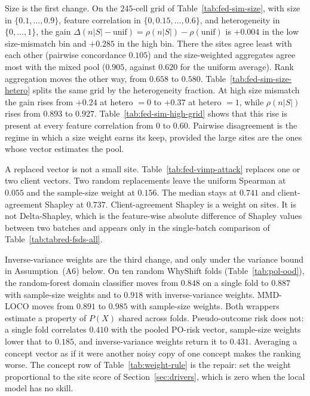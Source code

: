 Size is the first change.
On the \(245\)-cell grid of Table~\ref{tab:fed-sim-size}, with size in
\(\{0.1,\ldots,0.9\}\), feature correlation in \(\{0,0.15,\ldots,0.6\}\),
and heterogeneity in \(\{0,\ldots,1\}\), the gain
\(\Delta(n|S|-\mathrm{unif})=\rho(n|S|)-\rho(\mathrm{unif})\) is
\(+0.004\) in the low size-mismatch bin and \(+0.285\) in the high bin.
There the sites agree least with each other (pairwise concordance
\(0.105\)) and the size-weighted aggregates agree most with the mixed pool
(\(0.905\), against \(0.620\) for the uniform average).
Rank aggregation moves the other way, from \(0.658\) to \(0.580\).
Table~\ref{tab:fed-sim-size-hetero} splits the same grid by the
heterogeneity fraction.
At high size mismatch the gain rises from \(+0.24\) at hetero \(=0\) to
\(+0.37\) at hetero \(=1\), while \(\rho(n|S|)\) rises from \(0.893\) to
\(0.927\).
Table~\ref{tab:fed-sim-high-grid} shows that this rise is present at every
feature correlation from \(0\) to \(0.60\).
Pairwise disagreement is the regime in which a size weight earns its keep,
provided the large sites are the ones whose vector estimates the pool.

A replaced vector is not a small site.
Table~\ref{tab:fed-vimp-attack} replaces one or two client vectors.
Two random replacements leave the uniform Spearman at \(0.055\) and the
sample-size weight at \(0.156\).
The median stays at \(0.741\) and client-agreement Shapley at \(0.737\).
Client-agreement Shapley is a weight on sites.
It is not Delta-Shapley, which is the feature-wise absolute difference of
Shapley values between two batches and appears only in the single-batch
comparison of Table~\ref{tab:tabred-fsds-all}.

Inverse-variance weights are the third change, and only under the variance
bound in Assumption~(A6) below.
On ten random WhyShift folds
(Table~\ref{tab:pol-ood}), the random-forest domain classifier moves from
\(0.848\) on a single fold to \(0.887\) with sample-size weights and to
\(0.918\) with inverse-variance weights.
MMD-LOCO moves from \(0.891\) to \(0.985\) with sample-size weights.
Both wrappers estimate a property of \(P(X)\) shared across folds.
Pseudo-outcome risk does not: a single fold correlates \(0.410\) with the
pooled PO-risk vector, sample-size weights lower that to \(0.185\), and
inverse-variance weights return it to \(0.431\).
Averaging a concept vector as if it were another noisy copy of one concept
makes the ranking worse.
The concept row of Table~\ref{tab:weight-rule} is the repair: set the
weight proportional to the site score of
Section~\ref{sec:drivers}, which is zero when the local model has no skill.

